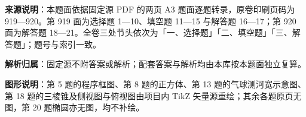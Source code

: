 

\begin{gknotice}
\textbf{来源说明}：本题面依据固定源 PDF 的两页 A3 题面逐题转录，原卷印刷页码为 919—920。第 919 面为选择题 1—10、填空题 11—15 与解答题 16—17；第 920 面为解答题 18—21。全卷三处节头依次为「一、选择题」「二、填空题」「三、解答题」；题号与索引一致。

\textbf{解析归属}：固定源不附答案或解析；配套答案与解析均由本库按本题面独立复算。

\textbf{图形说明}：第 5 题的程序框图、第 8 题的正方体、第 13 题的气球测河宽示意图、第 18 题的三棱锥及侧视图与俯视图由项目内 TikZ 矢量源重绘；其余各题原页无图，第 20 题椭圆亦无图，均不补绘。
\end{gknotice}


